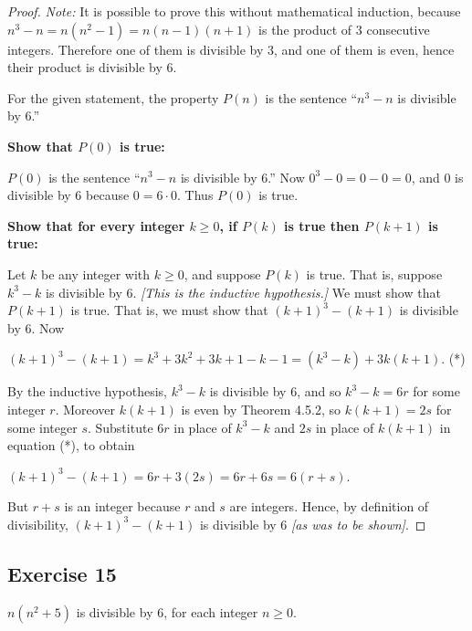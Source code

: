 \documentclass[14pt]{extarticle}
\begin{document}
\begin{proof}
{\it Note:} It is possible to prove this without mathematical induction, because $n^3 - n = n(n^2 - 1) = n(n-1)(n+1)$ is the product of 3 consecutive integers. Therefore one of them is divisible by 3, and one of them is even, hence their product is divisible by 6.

For the given statement, the property $P(n)$ is the sentence “$n^3 - n$ is divisible by 6.” 

{\bf Show that $P(0)$ is true:} 

$P(0)$ is the sentence “$n^3 - n$ is divisible by 6.” Now $0^3 - 0 = 0 - 0 = 0$, and 0 is divisible by 6 because $0 = 6 \cdot 0$. Thus $P(0)$ is true. 

{\bf Show that for every integer $k \geq 0$, if $P(k)$ is true then $P(k + 1)$ is true:} 

Let $k$ be any integer with $k \geq 0$, and suppose $P(k)$ is true. That is, suppose $k^3 - k$ is divisible by 6. {\it [This is the inductive hypothesis.]} We must show that $P(k + 1)$ is true. That is, we must show that $(k+1)^3 - (k+1)$ is divisible by 6. Now 

$(k + 1)^3 - (k + 1) = k^3 + 3k^2 + 3k + 1 - k - 1 = (k^3 - k) + 3k(k + 1)$. (*)

By the inductive hypothesis, $k^3 - k$ is divisible by 6, and so $k^3 - k = 6r$ for some integer $r$. Moreover $k(k+1)$ is even by Theorem 4.5.2, so $k(k+1) = 2s$ for some integer $s$. Substitute $6r$ in place of $k^3 - k$ and $2s$ in place of $k(k+1)$ in equation (*), to obtain 

$(k + 1)^3 - (k + 1) = 6r + 3(2s) = 6r + 6s = 6(r+s)$.

But $r+s$ is an integer because $r$ and $s$ are integers. Hence, by definition of divisibility, $(k + 1)^3 - (k + 1)$ is divisible by 6 {\it [as was to be shown]}.
\end{proof}

\subsection{Exercise 15}
$n(n^2 + 5)$ is divisible by 6, for each integer $n \geq 0$.
\end{document}

